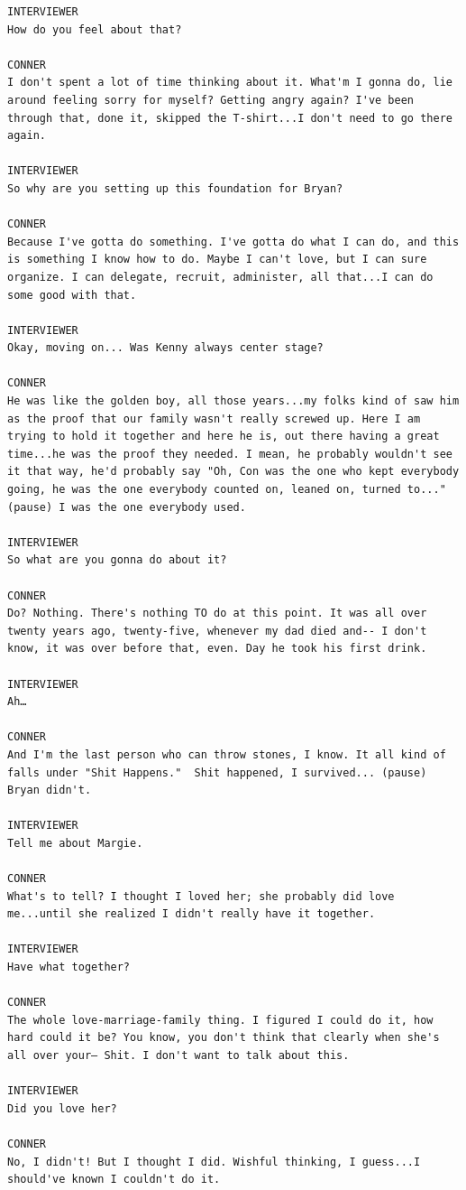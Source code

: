 \documentclass[openleft,oneside,showtrims]{memoir}
\begin{document}
\begin{lstlisting}
INTERVIEWER
How do you feel about that?

CONNER
I don't spent a lot of time thinking about it. What'm I gonna do, lie around feeling sorry for myself? Getting angry again? I've been through that, done it, skipped the T-shirt...I don't need to go there again.

INTERVIEWER
So why are you setting up this foundation for Bryan?

CONNER
Because I've gotta do something. I've gotta do what I can do, and this is something I know how to do. Maybe I can't love, but I can sure organize. I can delegate, recruit, administer, all that...I can do some good with that.

INTERVIEWER
Okay, moving on... Was Kenny always center stage?

CONNER
He was like the golden boy, all those years...my folks kind of saw him as the proof that our family wasn't really screwed up. Here I am trying to hold it together and here he is, out there having a great time...he was the proof they needed. I mean, he probably wouldn't see it that way, he'd probably say "Oh, Con was the one who kept everybody going, he was the one everybody counted on, leaned on, turned to..." (pause) I was the one everybody used.

INTERVIEWER
So what are you gonna do about it?

CONNER
Do? Nothing. There's nothing TO do at this point. It was all over twenty years ago, twenty-five, whenever my dad died and-- I don't know, it was over before that, even. Day he took his first drink.

INTERVIEWER
Ah…

CONNER
And I'm the last person who can throw stones, I know. It all kind of falls under "Shit Happens."  Shit happened, I survived... (pause) Bryan didn't.

INTERVIEWER
Tell me about Margie.

CONNER
What's to tell? I thought I loved her; she probably did love me...until she realized I didn't really have it together.

INTERVIEWER
Have what together?

CONNER
The whole love-marriage-family thing. I figured I could do it, how hard could it be? You know, you don't think that clearly when she's all over your— Shit. I don't want to talk about this.

INTERVIEWER
Did you love her?

CONNER
No, I didn't! But I thought I did. Wishful thinking, I guess...I should've known I couldn't do it.


\end{lstlisting}
\end{document}
